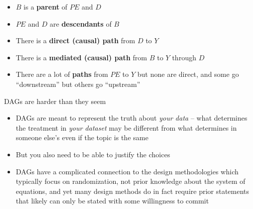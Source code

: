 \documentclass{beamer}
\begin{document}
\begin{frame}[plain]

  \begin{center}
  \end{center}

  \bigskip
  \begin{itemize}
    \item $B$ is a \textbf{parent} of $PE$ and $D$
    \item $PE$ and $D$ are \textbf{descendants} of $B$
    \item There is a \textbf{direct (causal) path} from $D$ to $Y$
    \item There is a \textbf{mediated (causal) path} from $B$ to $Y$ through $D$
    \item There are a lot of \textbf{paths} from $PE$ to $Y$ but none are direct, and some go ``downstream'' but others go ``upstream''
  \end{itemize}
\end{frame}





\begin{frame}{DAGs are harder than they seem}

	\begin{itemize}
	\item DAGs are meant to represent the truth about \emph{your data} -- what determines the treatment in \emph{your dataset} may be different from what determines in someone else's even if the topic is the same
	\item But you also need to be able to justify the choices 
	\item DAGs have a complicated connection to the design methodologies which typically focus on randomization, not prior knowledge about the system of equations, and yet many design methods do in fact require prior statements that likely can only be stated with some willingness to commit
	\end{itemize}
\end{frame}
\end{document}
